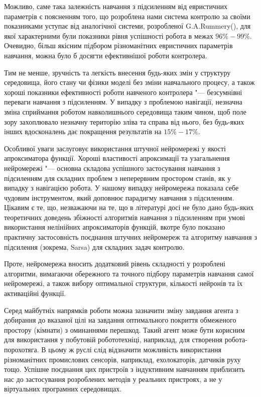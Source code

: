 Можливо, саме така залежність навчання з підсиленням від евристичних параметрів є поясненням того, що розроблена нами система контролю за своїми показниками уступає від аналогічної системи, розробленої G.A.Rummery(\cite{Rummery1995}), для якої характерними були показники рівня успішності робота в межах $96\%-99\%$. Очевидно, більш якісним підбором різноманітних евристичних параметрів навчання, можна було б досягти ефективнішої роботи контролера.

Тим не менше, зручність та легкість внесення будь-яких змін у структуру середовища, його стану чи фізики моделі без зміни навчального процесу, а також хороші показники ефективності роботи навченого контролера "--- безсумнівні переваги навчання з підсиленням. У випадку з проблемою навігації, незначна зміна сприймання роботом навколишнього середовища таким чином, щоб поле зору захоплювало незначну територію зліва та справа від нього, без будь-яких інших вдосконалень дає покращення результатів на $15\%-17\%$. 

Особливої уваги заслуговує використання штучної нейромережі у якості апроксиматора функції. Хороші властивості апроксимації та узагальнення нейромережі "--- основна складова успішного застосування навчання з підсиленням для складних проблем з неперервним простором станів, як у випадку з навігацією робота. У нашому випадку нейромережа показала себе чудовим інструментом, який доповнює парадигму навчання з підсиленням. Цікавим є те, що, незважаючи на те, що в літературі досі не було дано будь-яких теоретичних доведень збіжності алгоритмів навчання з підсиленням при умові використання нелінійних апроксиматорів функцій, вкотре було показано практичну застосовність поєднання штучних нейромереж та алгоритму навчання з підсилення (зокрема, Sarsa) для складних задач контролю. 

Проте, нейромережа вносить додатковий рівень складності у розроблені алгоритми, вимагаючи обережного та точного підбору параметрів навчання самої нейромережі, а також вибору оптимальної структури, кількості нейронів та їх активаційні функції. 

Серед майбутніх напрямків роботи можна зазначити зміну завдання агента з добирання до вказаної цілі на завдання оптимального покриття обмеженого простору (кімнати) з оминаннями перешкод. Такий агент може бути корисним для використання у побутовій робототехніці, наприклад, для створення робота-порохотяга. В цьому ж руслі слід відзначити можливість використання різноманітних промислових сенсорів, наприклад, ехолокаторів, датчиків руху тощо. Успішне поєднання цих пристроїв з індуктивним навчанням приблизить нас до застосування розроблених методів у реальних пристроях, а не у віртуальних програмних середовищах.


